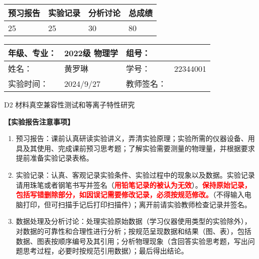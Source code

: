 \documentclass[dvipsnames, svgnames,a4paper,11pt]{article}
\begin{document}
	
	\begin{table}
		\renewcommand\arraystretch{1.7}
		\begin{tabularx}{\textwidth}{
				|X|X|X|X
				|X|X|X|X|}
			\hline
			\multicolumn{2}{|c|}{预习报告}&\multicolumn{2}{|c|}{实验记录}&\multicolumn{2}{|c|}{分析讨论}&\multicolumn{2}{|c|}{总成绩}\\
			\hline
			\LARGE25 & & \LARGE25 & & \LARGE30 & & \LARGE80 & \\
			\hline
		\end{tabularx}
	\end{table}
	
	\begin{table}
		\renewcommand\arraystretch{1.7}
		\begin{tabularx}{\textwidth}{|X|X|X|X|}
			\hline
			年级、专业： & 2022级 物理学 &组号： & \\
			\hline
			姓名： & 黄罗琳 & 学号： &  22344001 \\
			\hline
			实验时间： & 2024/9/27 & 教师签名： & \\
			\hline
		\end{tabularx}
	\end{table}
	
	\begin{center}
		\LARGE D2 \quad 材料真空兼容性测试和等离子特性研究
	\end{center}
	
	
	\textbf{【实验报告注意事项】}
	
		\begin{enumerate}
			\item 预习报告：课前认真研读实验讲义，弄清实验原理；实验所需的仪器设备、用具及其使用、完成课前预习思考题；了解实验需要测量的物理量，并根据要求提前准备实验记录表格。
			\item 实验记录：认真、客观记录实验条件、实验过程中的现象以及数据。实验记录请用珠笔或者钢笔书写并签名（\textcolor{red}{\textbf{用铅笔记录的被认为无效}}）。\textcolor{red}{\textbf{保持原始记录，包括写错删除部分，如因误记需要修改记录，必须按规范修改。}}（不得输入电脑打印，但可扫描手记后打印扫描件）；离开前请实验教师检查记录并签名。
			\item 数据处理及分析讨论：处理实验原始数据（学习仪器使用类型的实验除外），对数据的可靠性和合理性进行分析；按规范呈现数据和结果（图、表），包括数据、图表按顺序编号及其引用；分析物理现象（含回答实验思考题，写出问题思考过程，必要时按规范引用数据）；最后得出结论。
		\end{enumerate}
		
\end{document}
